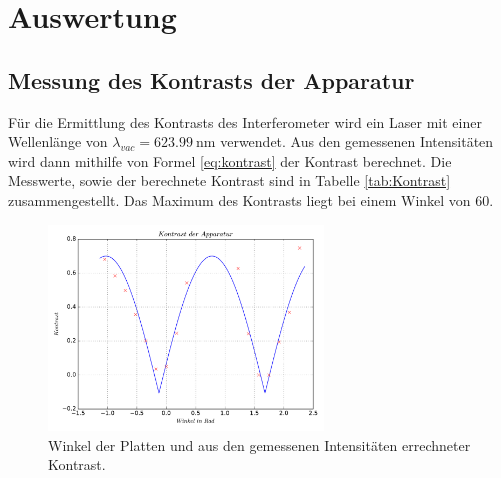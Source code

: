 \section{Auswertung}
\subsection{Messung des Kontrasts der Apparatur}
Für die Ermittlung des Kontrasts des Interferometer wird ein Laser mit einer Wellenlänge von $\lambda_{vac}=\SI{623.99}{\nano\meter}$ verwendet.
Aus den gemessenen Intensitäten wird dann mithilfe von Formel \eqref{eq:kontrast} der Kontrast berechnet.
Die Messwerte, sowie der berechnete Kontrast sind in Tabelle \ref{tab:Kontrast} zusammengestellt.
Das Maximum des Kontrasts liegt bei einem Winkel von 60\circ.\\
\begin{figure}[H]
  \center
  \includegraphics[width=0.65\textwidth]{./plots/kontrastplot.pdf}
  \caption{Winkel der Platten und aus den gemessenen Intensitäten errechneter Kontrast.}
  \label{fig:kontrastplot}
\end{figure}
